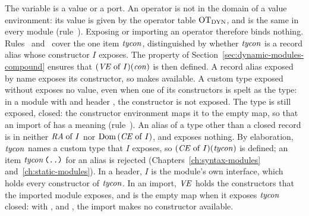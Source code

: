 
  {}

  {}

  {}

  {}

  {}

\begin{rulecomments}
 The variable is a value or a port.
 An operator is not in the domain of a value
environment: its value is given by the operator table $\mathrm{OT}_{\mathrm{DYN}}$, and is the
same in every module (rule~). Exposing or importing an
operator therefore binds nothing. %
 Rules~
and~ cover the one item $\mathit{tycon}$, distinguished by
whether $\mathit{tycon}$ is a record alias whose constructor $I$ exposes. The
property of Section~\ref{sec:dynamic-modules-compound} ensures that
$(\mathit{VE}\mathrel{\mathrm{of}} I)(\mathit{con})$ is then defined. A record alias exposed by name exposes
its constructor, so  makes 
available.
 A custom type exposed without 
exposes no value, even when one of its constructors is spelt as the type: in
a module with  and header , the
constructor  is not exposed. The type is still exposed, closed: the
constructor environment maps it to the empty map, so that an import of
 has a meaning (rule~). An alias of a
type other than a closed record is in neither $\mathit{RA}\mathrel{\mathrm{of}} I$ nor
$\mathrm{Dom}\,(\mathit{CE}\mathrel{\mathrm{of}} I)$, and exposes nothing. %
 By elaboration, $\mathit{tycon}$ names a custom type
that $I$ exposes, so $(\mathit{CE}\mathrel{\mathrm{of}} I)(\mathit{tycon})$ is defined; an item
$\mathit{tycon}\,\textnormal{\texttt{(..)}}$ for an alias is rejected
(Chapters~\ref{ch:syntax-modules} and~\ref{ch:static-modules}). In a header,
$I$ is the module's own interface, which holds every constructor of
$\mathit{tycon}$. In an import, $\mathit{VE}$ holds the constructors that the imported
module exposes, and is the empty map when it exposes $\mathit{tycon}$ closed: with
,  and
, the import makes no constructor available.
\end{rulecomments}

